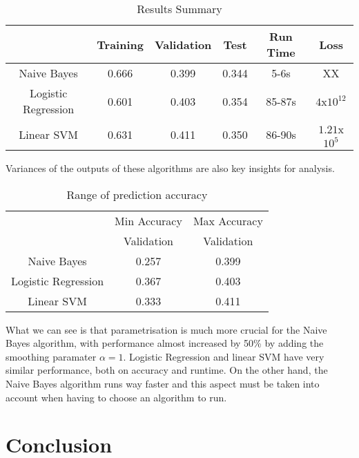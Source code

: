 \documentclass[11pt]{article}
\begin{document}
\begin{table}[h!]
\centering
\caption{Results Summary}
\label{Results Summary}
\begin{tabular}{c|c|c|c|c|c|}
\cline{2-6}
\multicolumn{1}{l|}{}                     & Training & Validation & Test  & Run Time & Loss                      \\ \hline
\multicolumn{1}{|c|}{Naive Bayes}         & 0.666    & 0.399      & 0.344 & 5-6s     &    XX                       \\ \cline{1-1}
\multicolumn{1}{|c|}{Logistic Regression} & 0.601    & 0.403      & 0.354 & 85-87s   & $4$x$10^{12}$   \\ \cline{1-1}
\multicolumn{1}{|c|}{Linear SVM}          & 0.631    & 0.411      & 0.350 & 86-90s   & $1.21$x$10^5$ \\ \hline
\end{tabular}
\end{table}

Variances of the outputs of these algorithms are also key insights for analysis.\\

\begin{table}[h!]
\centering
\caption{Range of prediction accuracy}
\label{my-label}
\begin{tabular}{c|c|c|}
\cline{2-3}
\multicolumn{1}{l|}{}                     & Min Accuracy & Max Accuracy \\ \cline{2-3} 
\multicolumn{1}{l|}{}                     & Validation   & Validation   \\ \hline
\multicolumn{1}{|c|}{Naive Bayes}         & 0.257        & 0.399        \\ \hline
\multicolumn{1}{|c|}{Logistic Regression} & 0.367        & 0.403        \\ \hline
\multicolumn{1}{|c|}{Linear SVM}          & 0.333        & 0.411        \\ \hline
\end{tabular}
\end{table}

What we can see is that parametrisation is much more crucial for the Naive Bayes algorithm, with performance almost increased by 50\% by adding the smoothing paramater $\alpha = 1$. Logistic Regression and linear SVM have very similar performance, both on accuracy and runtime. On the other hand, the Naive Bayes algorithm runs way faster and this aspect must be taken into account when having to choose an algorithm to run.
 

\section{Conclusion}
\end{document}
